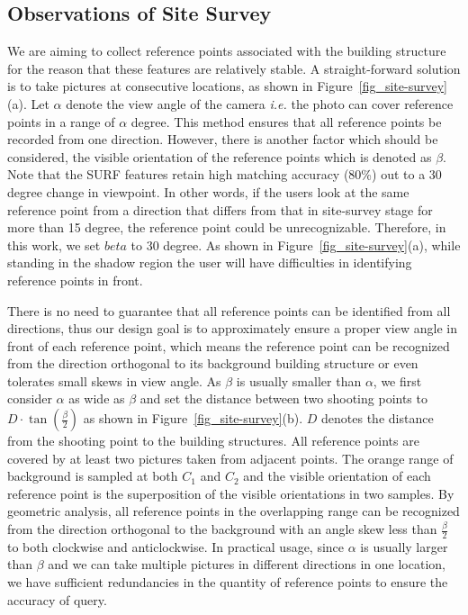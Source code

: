 \documentclass[10pt, conference, letterpaper]{IEEEtran}
\def\ie{\textit{i.e.}\xspace}
\begin{document}
\subsection{Observations of Site Survey}

We are aiming to collect reference points associated with the building structure for the reason that these features are relatively stable.
A straight-forward solution is to take pictures at consecutive locations, as shown in Figure~\ref{fig_site-survey}(a). Let $\alpha$ denote the view angle of the camera \ie the photo can cover reference points in a range of $\alpha$ degree.
This method ensures that all reference points be recorded from one direction.
However, there is another factor which should be considered, the visible orientation of the reference points which is denoted as $\beta$. Note that the SURF features retain high matching accuracy (80\%) out to a 30 degree change in viewpoint. In other words, if the users look at the same reference point from a direction that differs from that in site-survey stage for more than 15 degree, the reference point could be unrecognizable. Therefore, in this work, we set $beta$ to 30 degree.
As shown in Figure~\ref{fig_site-survey}(a), while standing in the shadow region the user will have difficulties in identifying reference points in front.

There is no need to guarantee that all reference points can be identified from all directions, thus our design goal is to approximately ensure a proper view angle in front of each reference point, which means the reference point can be recognized from the direction orthogonal to its background building structure or even tolerates small skews in view angle. As $\beta$ is usually smaller than $\alpha$, we first consider $\alpha$ as wide as $\beta$ and set the distance between two shooting points to $D\cdot \tan(\frac{\beta}{2})$ as shown in Figure~\ref{fig_site-survey}(b). $D$ denotes the distance from the shooting point to the building structures. All reference points are covered by at least two pictures taken from adjacent points. The orange range of background is sampled at both $C_1$ and $C_2$ and the visible orientation of each reference point is the superposition of the visible orientations in two samples. By geometric analysis, all reference points in the overlapping range can be recognized from the direction orthogonal to the background with an angle skew less than $\frac{\beta}{2}$ to both clockwise and anticlockwise.
In practical usage, since $\alpha$ is usually larger than $\beta$ and we can take multiple pictures in different directions in one location, we have sufficient redundancies in the quantity of reference points to ensure the accuracy of query.
\end{document}
